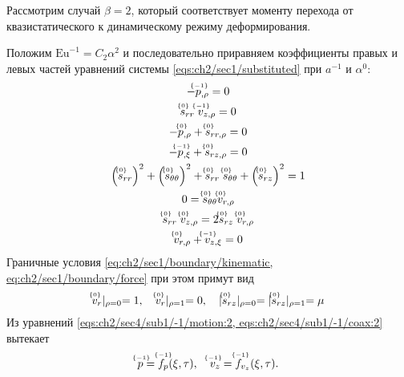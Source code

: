 Рассмотрим случай $\beta=2$, который соответствует моменту перехода от квазистатического к динамическому режиму деформирования.

Положим $\text{Eu}^{-1} = C_2 \alpha^2$ и последовательно приравняем коэффициенты правых и левых частей уравнений системы \cref{eqs:ch2/sec1/substituted} при $a^{-1}$ и $\alpha^0$:
\begingroup
\allowdisplaybreaks
\begin{subequations}
  \label{eqs:ch2/sec4/sub1/main}
  \begin{gather}
    \label{eqs:ch2/sec4/sub1/-1/motion:2}
    -\uindex{p}{-1}_{,\rho} = 0
    \\
    \label{eqs:ch2/sec4/sub1/-1/coax:2}
    \uindex{s}{0}_{rr} \; \uindex{v}{-1}_{z,\rho} = 0
    \\
    \label{eqs:ch2/sec4/sub1/0/motion:1}
    -\uindex{p}{0}_{,\rho}+\uindex{s}{0}_{rr,\rho} = 0
    \\
    \label{eqs:ch2/sec4/sub1/0/motion:2}
    -\uindex{p}{-1}_{,\xi} + \uindex{s}{0}_{rz,\rho} = 0
    \\
    \label{eqs:ch2/sec4/sub1/0/plasticity}
    \left(\uindex{s}{0}_{rr}\right)^2 + \left(\uindex{s}{0}_{\theta\theta}\right)^2 + \uindex{s}{0}_{rr}\; \uindex{s}{0}_{\theta\theta} + \left(\uindex{s}{0}_{rz}\right)^2 = 1
    \\
    \label{eqs:ch2/sec4/sub1/0/coax:1}
    0 = \uindex{s}{0}_{\theta\theta} \uindex{v}{0}_{r,\rho}
    \\
    \label{eqs:ch2/sec4/sub1/0/coax:2}
    \uindex{s}{0}_{rr} \; \uindex{v}{0}_{z,\rho} = 2 \uindex{s}{0}_{rz} \; \uindex{v}{0}_{r,\rho}
    \\
    \label{eqs:ch2/sec4/sub1/0/uncompress}
    \uindex{v}{0}_{r,\rho} + \uindex{v}{-1}_{z,\xi} = 0
  \end{gather}
\end{subequations}
\endgroup
Граничные условия \cref{eq:ch2/sec1/boundary/kinematic, eq:ch2/sec1/boundary/force} при этом примут вид
\begin{equation}
  \label{eq:ch2/sec4/sub1/boundary/0}
  \uindex{v}{0}_{r}\lvert_{\rho=0} = 1,\quad \uindex{v}{0}_{r}\lvert_{\rho=1} = 0, \quad \lvert \uindex{s}{0}_{rz}\lvert_{\rho=0} = \lvert \uindex{s}{0}_{rz}\lvert_{\rho=1} = \mu
\end{equation}
Из уравнений \cref{eqs:ch2/sec4/sub1/-1/motion:2, eqs:ch2/sec4/sub1/-1/coax:2} вытекает
\begin{equation*}
  \uindex{p}{-1} = \uindex{f}{-1}_{p}(\xi, \tau), \quad \uindex{v}{-1}_{z} = \uindex{f}{-1}_{v_{z}}(\xi, \tau).
\end{equation*}

